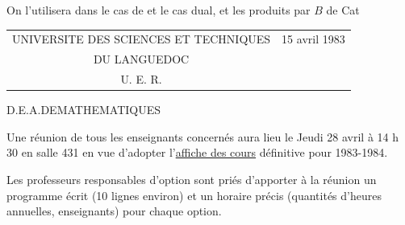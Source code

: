 On l'utilisera dans le cas de
et le cas dual, et les produits par  $B$ de Cat
\begin{tabular}{c@{\qquad\qquad}l}
UNIVERSITE DES SCIENCES ET TECHNIQUES & 15 avril 1983\\
DU LANGUEDOC &\\
U. E. R.\quad 5 &
\end{tabular}

\begin{center}
D.E.A.\quad DE\quad MATHEMATIQUES
\end{center}

Une réunion de tous les enseignants concernés aura lieu le
Jeudi 28 avril à 14 h 30 en salle 431 en vue d'adopter l'\uline{affiche des cours}
définitive pour 1983-1984.

Les professeurs responsables d'option sont priés d'apporter
à la réunion un programme écrit (10 lignes environ) et un horaire précis
(quantités d'heures annuelles, enseignants) pour chaque option.


